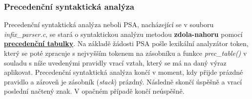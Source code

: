 \documentclass[a4paper, 12pt]{article} %
\begin{document}
            \subsubsection{Precedenční syntaktická analýza}
                Precedenční syntaktická analýza neboli PSA, nacházející se v souboru \textit{infix\_parser.c}, 
                se stará o syntaktickou analýzu metodou
                \textbf{zdola-nahoru} pomocí \hyperref[prectabulka]{\textbf{precedenční tabulky}}. Na základě
                žádosti PSA pošle lexikální analyzátor token, který se poté zpracuje s nejvyšším tokenem
                na zásobníku a funkce \textit{prec\_table()} v souladu s níže uvedenými pravidly vrací vztah,
                který se má na daný výraz aplikovat. Precedenční syntaktická analýza končí v moment, kdy 
                přijde prázdné pravidlo a zároveň je zásobník (\textit{stack}) prázdný. Následně skončí 
                úspěšně a vrací poslední načtený znak. V opačném případě končí neúspěšně.
\end{document}

